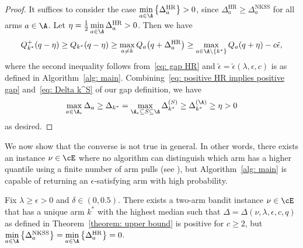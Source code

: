 \begin{proof}
    It suffices to consider the case
    $ \min\limits_{a \in \A}  
    \left\{ \Delta_a^{\mathrm{HR}} \right\} > 0$,
    since $\Delta_a^{\mathrm{HR}} \ge \Delta_a^{\mathrm{NKSS}}$ for all arms $a \in \A$.
    Let $\eta = \frac{1}{2} \min\limits_{a \in \A}  \Delta_a^{\mathrm{HR}} > 0$.
    Then we have
    \begin{equation}
    \label{eq: positive HR implies positive gap}
        Q_{k^*}^+(q - \eta)
        \ge 
         Q_{k^*}(q - \eta)
        \ge 
        \max\limits_{a \neq k}
        Q_{a}\big(q + \Delta_a^{\mathrm{HR}}\big)
        \ge
        \max\limits_{a \in \A \setminus \{k^*\} } Q_a(q + \eta) - c \tilde{\epsilon},
    \end{equation}
    where the second inequality follows from~\eqref{eq: gap HR} 
    and $\tilde{\epsilon} = \tilde{\epsilon}(\lambda, \epsilon, c)$ is as defined in Algorithm~\ref{alg: main}.
    Combining~\eqref{eq: positive HR implies positive gap} and~\eqref{eq: Delta k^S} of our gap definition,  we have
    \begin{equation}
        \max\limits_{a \in \A_{\epsilon}} \Delta_{a} 
        \ge 
        \Delta_{k^*}  = \max\limits_{\A_{\epsilon} \subseteq S \subseteq \A}
        \Delta_{k^*}^{(S)} 
        \ge
        \Delta_{k^*}^{(\A)} \ge \eta > 0
    \end{equation}
    as desired.
\end{proof}



We now show that the converse is not true in general. 
In other words, there exists an instance $\nu \in \cE$ where no algorithm can distinguish which arm has a higher quantile using a finite number of arm pulls (see \cite[Theorem 2]{nikolakakis2021quantile}), but Algorithm~\ref{alg: main} is capable of returning an $\epsilon$-satisfying arm with high probability.

\begin{proposition}
\label{prop: converse zero gap not true}
    Fix $\lambda \ge \epsilon > 0$ and $\delta \in (0, 0.5)$.
    There exists a two-arm bandit instance $\nu \in \cE$ that has a unique arm $k^*$ with the highest median such that
    $\Delta =  \Delta(\nu, \lambda, \epsilon, c, q) $ as defined in Theorem~\ref{theorem: upper bound} is positive for $c \ge 2$,
    but $\min\limits_{a \in \A} \big\{ \Delta_a^{\mathrm{NKSS}}  \big\} 
= \min\limits_{a \in \A} \big\{ \Delta_a^{\mathrm{HR}}  \big\} = 0$.
\end{proposition}

